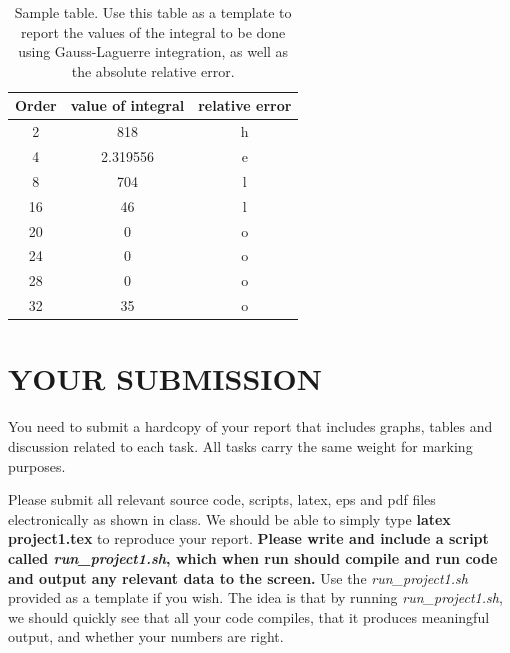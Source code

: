 \documentclass{article}
\begin{document}

\begin{table}
\begin{tabular}{|c|c|c|}
\hline
Order & value of integral & relative error \\
\hline
2 &  818 &  h\\
4 &  2.319556 & e \\
8 & 704 & l\\
16 & 46 & l\\
20 & 0 &  o \\
24 & 0 & o \\
28 & 0 & o \\
32 & 35 & o\\
\hline
\end{tabular}
\caption{
Sample table.  Use this table as a template to report the values of the integral to be done using
Gauss-Laguerre integration, as well as the absolute relative error.}
\label{tab1}
\end{table}

\section{YOUR SUBMISSION}

You need to submit a hardcopy of your report that includes graphs, tables and discussion related to 
each task.  All tasks carry the same weight for marking purposes.

Please submit all relevant source code, scripts, latex, eps and pdf files electronically as shown in class. We should be able to simply type {\bf latex project1.tex} to reproduce your report.  {\bf Please write and  
include a script called {\it run\_project1.sh}, which when run should compile and run code and output any relevant data to the screen. } Use the {\it run\_project1.sh} provided as a template if you wish.  The idea is that by running {\it run\_project1.sh}, we should quickly see that all your code compiles, that it produces meaningful output, and whether your numbers are right.  
\end{document}
